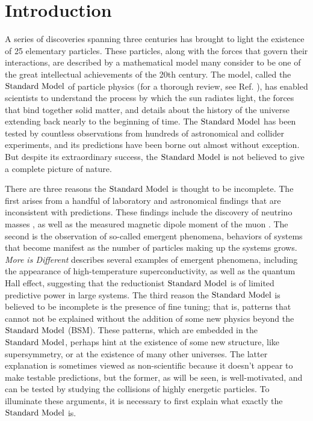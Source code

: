 \chapter{Introduction}

A series of discoveries spanning three centuries has brought to light the existence of 25 elementary particles. These particles, along with the forces that govern their interactions, are described by a mathematical model many consider to be one of the great intellectual achievements of the 20th century. The model, called the $\text{Standard\ Model}$ of particle physics (for a thorough review, see Ref. \cite{Rosner:2001zy}), has enabled scientists to understand the process by which the sun radiates light, the forces that bind together solid matter, and details about the history of the universe extending back nearly to the beginning of time. The $\text{Standard\ Model}$ has been tested by countless observations from hundreds of astronomical and collider experiments, and its predictions have been borne out almost without exception. But despite its extraordinary success, the $\text{Standard\ Model}$ is not believed to give a complete picture of nature.

There are three reasons the $\text{Standard\ Model}$ is thought to be incomplete. The first arises from a handful of laboratory and astronomical findings that are inconsistent with predictions. These findings include the discovery of neutrino masses \cite{Fukuda:1998mi}, as well as the measured magnetic dipole moment of the muon \cite{Bennett:2006fi}. The second is the observation of so-called emergent phenomena, behaviors of systems that become manifest as the number of particles making up the systems grows. {\it More is Different} \cite{Broglia:2012ef} describes several examples of emergent phenomena, including the appearance of high-temperature superconductivity, as well as the quantum Hall effect, suggesting that the reductionist $\text{Standard\ Model}$ is of limited predictive power in large systems. The third reason the $\text{Standard\ Model}$ is believed to be incomplete is the presence of fine tuning; that is, patterns that cannot not be explained without the addition of some new physics beyond the $\text{Standard\ Model}$ (BSM). These patterns, which are embedded in the $\text{Standard\ Model}$, perhaps hint at the existence of some new structure,  like supersymmetry, or at the existence of many other universes. The latter explanation is sometimes viewed as non-scientific because it doesn't appear to make testable predictions, but the former, as will be seen, is well-motivated, and can be tested by studying the collisions of highly energetic particles. To illuminate these arguments, it is necessary to first explain what exactly the $\text{Standard\ Model}$ is.


